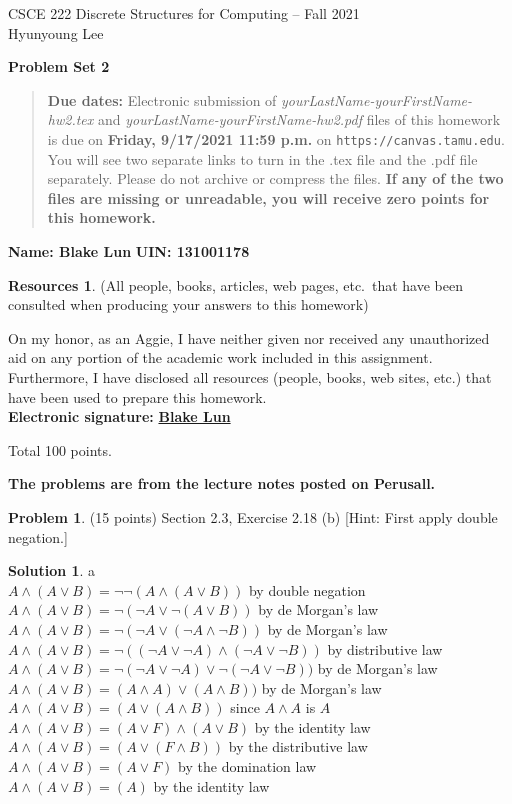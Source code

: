 \documentclass{article}
\theoremstyle{definition}
\newtheorem{problem}{Problem}
\newtheorem*{solution}{Solution}
\newtheorem*{resources}{Resources}
\newcommand{\name}[2]{\noindent\textbf{Name: #1}\hfill \textbf{UIN: #2}}
\newcommand{\honor}{\noindent On my honor, as an Aggie, I have neither
  given nor received any unauthorized aid on any portion of the
  academic work included in this assignment. Furthermore, I have
  disclosed all resources (people, books, web sites, etc.) that have
  been used to prepare this homework. \\[2ex]
 \textbf{Electronic signature:} \underline{ \textbf{Blake Lun} } }
\newcommand{\problemset}[1]{\begin{center}\textbf{Problem Set #1}\end{center}}
\newcommand{\duedate}[1]{\begin{quote}\textbf{Due dates:} Electronic
    submission of \textsl{yourLastName-yourFirstName-hw2.tex} and 
    \textsl{yourLastName-yourFirstName-hw2.pdf} files of this homework is due on
    \textbf{#1} on \texttt{https://canvas.tamu.edu}. You will see two separate links
    to turn in the .tex file and the .pdf file separately. Please do not archive or compress the files.  
    \textbf{If any of the two files are missing or unreadable, you will receive zero points for this
    homework.}\end{quote} }
\begin{document}
\vspace*{-20mm}
\begin{center}
{\large
CSCE 222 Discrete Structures for Computing -- Fall 2021\\[.5ex]
Hyunyoung Lee\\}
\end{center}
\problemset{2}
\duedate{Friday, 9/17/2021 11:59 p.m.}
\name{ Blake Lun }{ 131001178 }
\begin{resources} (All people, books, articles, web pages, etc.\ that
  have been consulted when producing your answers to this homework)
\end{resources}
\honor

\bigskip

\noindent
Total 100 points.

\bigskip

\noindent
\textbf{The problems are from the lecture notes posted on Perusall.}

\medskip

\begin{problem} (15 points) Section 2.3, Exercise 2.18 (b) 
[Hint: First apply double negation.]
\end{problem}
\begin{solution} a\\
$A \land (A\lor B) = \lnot\lnot(A \land (A\lor B))$ by double negation\\
$A \land (A\lor B) = \lnot(\lnot A \lor \lnot(A\lor B))$ by de Morgan's law\\
$A \land (A\lor B) = \lnot(\lnot A \lor (\lnot A\land \lnot B))$ by de Morgan's law\\
$A \land (A\lor B) = \lnot((\lnot A \lor \lnot A) \land (\lnot A\lor \lnot B))$ by distributive law\\
$A \land (A\lor B) = \lnot(\lnot A \lor \lnot A) \lor \lnot(\lnot A\lor \lnot B))$ by de Morgan's law\\
$A \land (A\lor B) = (A \land A) \lor (A \land B))$ by de Morgan's law\\
$A \land (A\lor B) = (A \lor (A \land B))$ since $A \land A$ is $A$\\
$A \land (A\lor B) = (A \lor F) \land (A \lor B)$ by the identity law\\
$A \land (A\lor B) = (A \lor (F \land B))$ by the distributive law\\
$A \land (A\lor B) = (A \lor F)$ by the domination law\\
$A \land (A\lor B) = (A)$ by the identity law\\

\end{solution}
\end{document}
